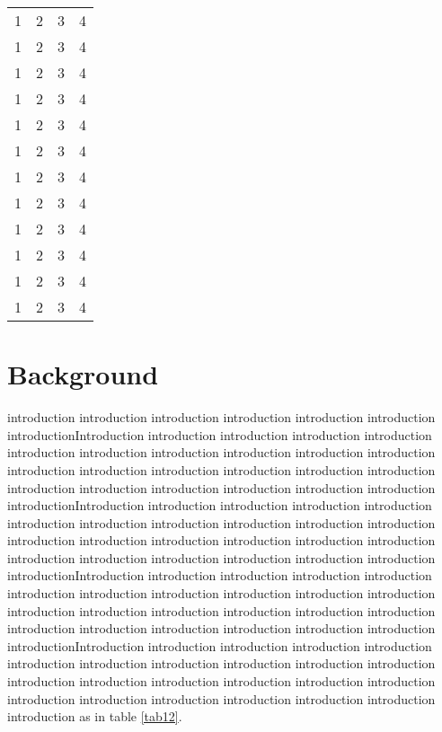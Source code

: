 \begin{longtable}{|c|c|c|c|}
1 & 2 & 3 & 4 \\ 1 & 2 & 3 & 4 \\ 1 & 2 & 3 & 4 \\ 1 & 2 & 3 & 4 \\
1 & 2 & 3 & 4 \\ 1 & 2 & 3 & 4 \\ 1 & 2 & 3 & 4 \\ 1 & 2 & 3 & 4 \\
1 & 2 & 3 & 4 \\ 1 & 2 & 3 & 4 \\ 1 & 2 & 3 & 4 \\ 1 & 2 & 3 & 4 \\
\end{longtable}
\section{Background}
introduction introduction introduction introduction introduction introduction 
introductionIntroduction introduction introduction introduction introduction introduction introduction introduction introduction introduction introduction introduction introduction introduction introduction introduction introduction introduction introduction introduction introduction introduction introduction introductionIntroduction introduction introduction introduction introduction introduction introduction introduction introduction introduction introduction introduction introduction introduction introduction introduction introduction introduction introduction introduction introduction introduction introduction introductionIntroduction introduction introduction introduction introduction introduction introduction introduction introduction introduction introduction introduction introduction introduction introduction introduction introduction introduction introduction introduction introduction introduction introduction introductionIntroduction introduction introduction introduction introduction introduction introduction introduction introduction introduction introduction introduction introduction introduction introduction introduction introduction introduction introduction introduction introduction introduction introduction introduction as in table \ref{tab12}.

